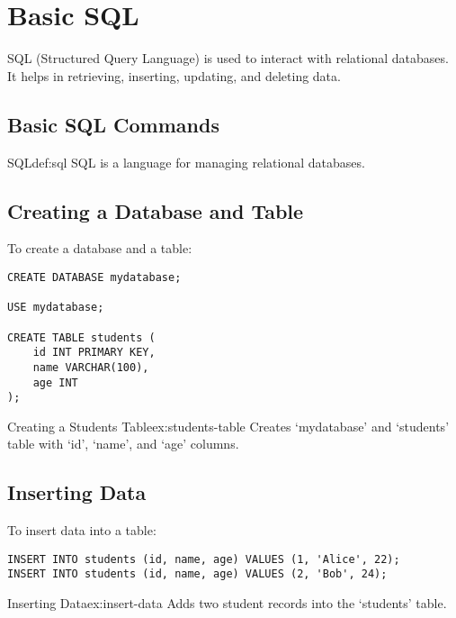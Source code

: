 \chapter{Basic SQL}

SQL (Structured Query Language) is used to interact with relational databases. It helps in retrieving, inserting, updating, and deleting data.

\section{Basic SQL Commands}

\begin{definitiontcb}{SQL}{def:sql}
SQL is a language for managing relational databases.
\end{definitiontcb}

\section{Creating a Database and Table}

To create a database and a table:

\begin{verbatim}
CREATE DATABASE mydatabase;

USE mydatabase;

CREATE TABLE students (
    id INT PRIMARY KEY,
    name VARCHAR(100),
    age INT
);
\end{verbatim}

\begin{exampletcb}{Creating a Students Table}{ex:students-table}
Creates `mydatabase' and `students' table with `id', `name', and `age' columns.
\end{exampletcb}

\section{Inserting Data}

To insert data into a table:

\begin{verbatim}
INSERT INTO students (id, name, age) VALUES (1, 'Alice', 22);
INSERT INTO students (id, name, age) VALUES (2, 'Bob', 24);
\end{verbatim}

\begin{exampletcb}{Inserting Data}{ex:insert-data}
Adds two student records into the `students' table.
\end{exampletcb}

